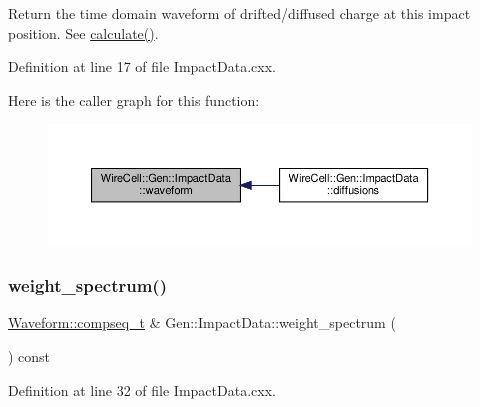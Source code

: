 Return the time domain waveform of drifted/diffused charge at this impact position. See {\ttfamily \hyperlink{class_wire_cell_1_1_gen_1_1_impact_data_a323019d50d44dea084f1691da674b755}{calculate()}}. 

Definition at line 17 of file Impact\+Data.\+cxx.

Here is the caller graph for this function\+:
\nopagebreak
\begin{figure}[H]
\begin{center}
\leavevmode
\includegraphics[width=350pt]{class_wire_cell_1_1_gen_1_1_impact_data_a80d2f6a9ccdbba236c9e75360316b014_icgraph}
\end{center}
\end{figure}
\mbox{\label{class_wire_cell_1_1_gen_1_1_impact_data_a81cef30a2ec41d8b63f07267506582d1}} 
\subsubsection{\texorpdfstring{weight\+\_\+spectrum()}{weight\_spectrum()}}
{\footnotesize\ttfamily \hyperlink{namespace_wire_cell_1_1_waveform_a7e4a8d371f774438bb360e7d1dcb583a}{Waveform\+::compseq\+\_\+t} \& Gen\+::\+Impact\+Data\+::weight\+\_\+spectrum (\begin{DoxyParamCaption}{ }\end{DoxyParamCaption}) const}



Definition at line 32 of file Impact\+Data.\+cxx.

